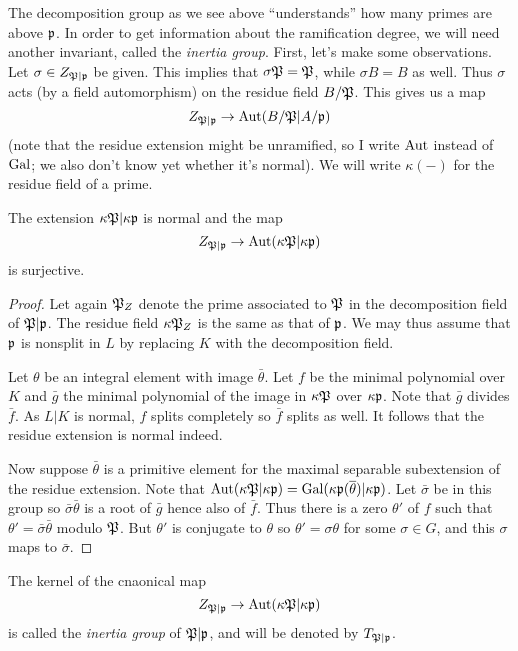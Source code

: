 The decomposition group as we see above ``understands'' how many primes are above $\mathfrak{p}$.
In order to get information about the ramification degree, we will need another invariant, called the \emph{inertia group}.
First, let's make some observations.
Let $\sigma \in Z_{\mathfrak{P}|\mathfrak{p}}$ be given.
This implies that $\sigma \mathfrak{P} = \mathfrak{P}$, while $\sigma B = B$ as well.
Thus $\sigma$ acts (by a field automorphism) on the residue field $B/\mathfrak{P}$.
This gives us a map
\[ Z_{\mathfrak{P}|\mathfrak{p}} \to \operatorname{Aut}(B/\mathfrak{P}|A/\mathfrak{p}) \]
(note that the residue extension might be unramified, so I write $\operatorname{Aut}$ instead of $\operatorname{Gal}$; we also don't know yet whether it's normal).
We will write $\kappa(-)$ for the residue field of a prime.

\begin{proposition}
  The extension $\kappa\mathfrak{P}|\kappa\mathfrak{p}$ is normal and the map
  \[ Z_{\mathfrak{P}|\mathfrak{p}} \to \operatorname{Aut}(\kappa\mathfrak{P}|\kappa\mathfrak{p}) \]
  is surjective.
\end{proposition}
\begin{proof}
  Let again $\mathfrak{P}_{Z}$ denote the prime associated to $\mathfrak{P}$ in the decomposition field of $\mathfrak{P}|\mathfrak{p}$.
  The residue field $\kappa\mathfrak{P}_{Z}$ is the same as that of $\mathfrak{p}$.
  We may thus assume that $\mathfrak{p}$ is nonsplit in $L$ by replacing $K$ with the decomposition field.

  Let $\theta$ be an integral element with image $\bar \theta$.
  Let $f$ be the minimal polynomial over $K$ and $\bar g$ the minimal polynomial of the image in $\kappa\mathfrak{P}$ over $\kappa\mathfrak{p}$.
  Note that $\bar g$ divides $\bar f$.
  As $L|K$ is normal, $f$ splits completely so $\bar f$ splits as well.
  It follows that the residue extension is normal indeed.

  Now suppose $\bar\theta$ is a primitive element for the maximal separable subextension of the residue extension.
  Note that $\operatorname{Aut}(\kappa\mathfrak{P}|\kappa\mathfrak{p}) = \operatorname{Gal}(\kappa\mathfrak{p}(\overline\theta)|\kappa\mathfrak{p})$.
  Let $\bar\sigma$ be in this group so $\bar\sigma\bar\theta$ is a root of $\bar g$ hence also of $\bar f$.
  Thus there is a zero $\theta'$ of $f$ such that $\theta' = \bar\sigma\bar\theta$ modulo $\mathfrak{P}$.
  But $\theta'$ is conjugate to $\theta$ so $\theta' = \sigma\theta$ for some $\sigma \in G$, and this $\sigma$ maps to $\bar \sigma$.
\end{proof}

\begin{definition}
  The kernel of the cnaonical map
  \[ Z_{\mathfrak{P}|\mathfrak{p}} \to \operatorname{Aut}(\kappa\mathfrak{P}|\kappa\mathfrak{p}) \]
  is called the \emph{inertia group} of $\mathfrak{P}|\mathfrak{p}$, and will be denoted by $T_{\mathfrak{P}|\mathfrak{p}}$.
\end{definition}

